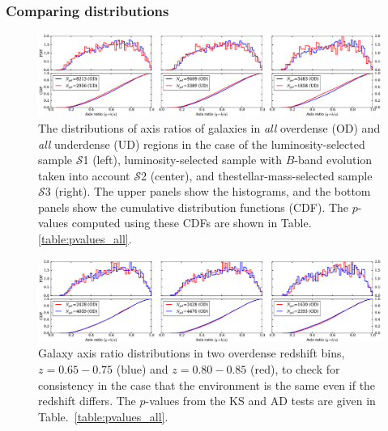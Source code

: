 \documentclass[twocolumn,useAMS,usenatbib]{mn2e}
\newcommand{\s}{\ensuremath{\mathcal{S}}}
\begin{document}
\subsubsection{Comparing distributions}
\label{subsubsec:compdist}
\begin{figure}
 \centering
 \includegraphics[width=2.2\columnwidth]{axis_ratio_all.eps}
 \caption{The distributions of axis ratios of galaxies in \emph{all}
   overdense (OD) and \emph{all} underdense (UD) regions in the case
   of the luminosity-selected sample \s1 (left), luminosity-selected
   sample with $B$-band evolution taken into account \s2 (center), and
   thestellar-mass-selected sample \s3 (right). The upper panels show
   the histograms, 
 and the bottom panels show the cumulative distribution functions
 (CDF). The $p$-values computed using these CDFs are shown in Table. \ref{table:pvalues_all}.}
 \label{fig:axisratio_all}
\end{figure}

\begin{figure}
 \centering
 \includegraphics[width=2.2\columnwidth]{axis_ratio_odod}
 \caption{Galaxy axis ratio
   distributions in two overdense redshift bins, $z=0.65-0.75$ (blue) and
   $z=0.80-0.85$ (red), to check for consistency in the case that the
   environment is the same even if the redshift differs. The
   $p$-values from the KS and AD tests are given in
   Table.~\ref{table:pvalues_all}.}
 \label{fig:axisratio_similar}
\end{figure}
\end{document}
